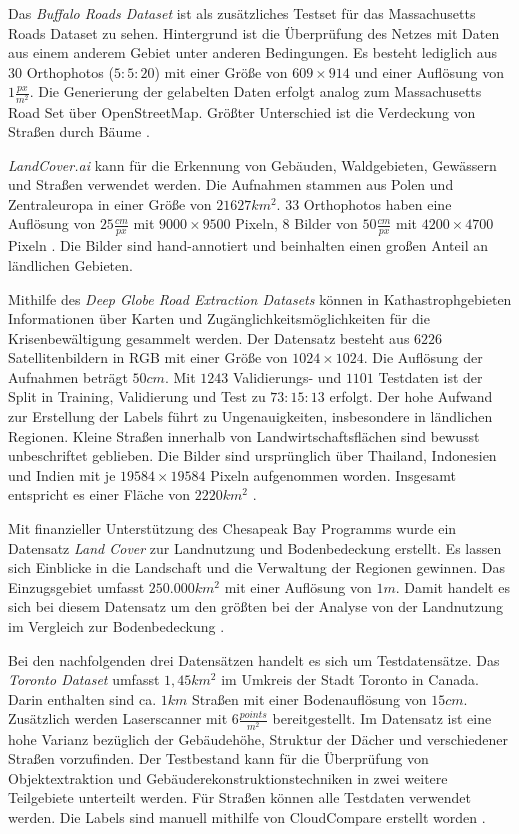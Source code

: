 Das \textit{Buffalo Roads Dataset} ist als zusätzliches Testset für das Massachusetts Roads Dataset zu sehen.
Hintergrund ist die Überprüfung des Netzes mit Daten aus einem anderem Gebiet unter anderen Bedingungen.
Es besteht lediglich aus 30 Orthophotos ($5:5:20$) mit einer Größe von $609\times 914$ und einer Auflösung von $1 \frac{px}{m^2}$.
Die Generierung der gelabelten Daten erfolgt analog zum Massachusetts Road Set über OpenStreetMap.
Größter Unterschied ist die Verdeckung von Straßen durch Bäume \cite[86-88]{.06.04.2014}.

\textit{LandCover.ai} kann für die Erkennung von Gebäuden, Waldgebieten, Gewässern und Straßen verwendet werden.
Die Aufnahmen stammen aus Polen und Zentraleuropa in einer Größe von $21627 km^2$.
$33$ Orthophotos haben eine Auflösung von $25 \frac{cm}{px}$ mit $9000\times 9500$ Pixeln, $8$ Bilder von $50 \frac{cm}{px}$ mit $4200 \times 4700$ Pixeln \cite{.20.04.2022}.
Die Bilder sind hand-annotiert und beinhalten einen großen Anteil an ländlichen Gebieten.

Mithilfe des \textit{Deep Globe Road Extraction Datasets} können in Kathastrophgebieten Informationen über Karten und Zugänglichkeitsmöglichkeiten für die Krisenbewältigung gesammelt werden.
Der Datensatz besteht aus $6226$ Satellitenbildern in RGB mit einer Größe von $1024\times 1024$.
Die Auflösung der Aufnahmen beträgt $50 cm$.
Mit $1243$ Validierungs- und $1101$ Testdaten ist der Split in Training, Validierung und Test zu $73:15:13$ erfolgt.
Der hohe Aufwand zur Erstellung der Labels führt zu Ungenauigkeiten, insbesondere in ländlichen Regionen. 
Kleine Straßen innerhalb von Landwirtschaftsflächen sind bewusst unbeschriftet geblieben.
Die Bilder sind ursprünglich über Thailand, Indonesien und Indien mit je $19584\times 19584$ Pixeln aufgenommen worden.
Insgesamt entspricht es einer Fläche von $2220 km^2$ \cite{Ashwath.10.11.2020}.

Mit finanzieller Unterstützung des Chesapeak Bay Programms wurde ein Datensatz \textit{Land Cover} zur Landnutzung und Bodenbedeckung erstellt.
Es lassen sich Einblicke in die Landschaft und die Verwaltung der Regionen gewinnen.
Das Einzugsgebiet umfasst $250.000km^2$ mit einer Auflösung von $1m$. 
Damit handelt es sich bei diesem Datensatz um den größten bei der Analyse von der Landnutzung im Vergleich zur Bodenbedeckung \cite{ChesapeakeConservancy.02.06.2022}.

Bei den nachfolgenden drei Datensätzen handelt es sich um Testdatensätze.
Das \textit{Toronto Dataset} umfasst $1,45km^2$ im Umkreis der Stadt Toronto in Canada. 
Darin enthalten sind ca. $1 km$ Straßen mit einer Bodenauflösung von $15cm$. 
Zusätzlich werden Laserscanner mit $6 \frac{points}{m^2}$ bereitgestellt.
Im Datensatz ist eine hohe Varianz bezüglich der Gebäudehöhe, Struktur der Dächer und verschiedener Straßen vorzufinden.
Der Testbestand kann für die Überprüfung von Objektextraktion und Gebäuderekonstruktionstechniken in zwei weitere Teilgebiete unterteilt werden.
Für Straßen können alle Testdaten verwendet werden.
Die Labels sind manuell mithilfe von CloudCompare erstellt worden \cite{Englich.06.10.2022b,Tan.2020}.

